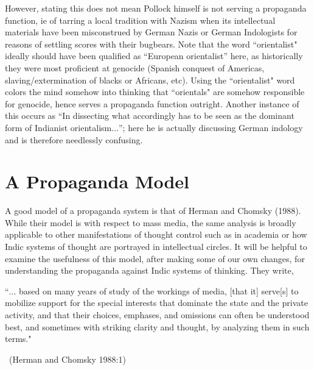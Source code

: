 However, stating this does not mean Pollock himself is not serving a propaganda function, ie of tarring a local tradition with Nazism when its intellectual materials have been misconstrued by German Nazis or German Indologists for reasons of settling scores with their bugbears. Note that the word ``orientalist" ideally should have been qualified as “European orientalist” here, as historically they were most proficient at genocide (Spanish conquest of Americas, slaving/extermination of blacks or Africans, etc). Using the ``orientalist" word colors the mind somehow into thinking that ``orientals" are somehow responsible for genocide, hence serves a propaganda function outright. Another instance of this occurs as “In dissecting what accordingly has to be seen as the dominant form of Indianist orientalism$\ldots$”; here he is actually discussing German indology and is therefore needlessly confusing.

\section*{A Propaganda Model}
A good model of a propaganda system is that of Herman and Chomsky (1988). While their model is with respect to mass media, the same analysis is broadly applicable to other manifestations of thought control such as in academia or how Indic systems of thought are portrayed in intellectual circles. It will be helpful to examine the usefulness of this model, after making some of our own changes, for understanding the propaganda against Indic systems of thinking. They write, 
\smallskip

\begin{myquote}
``$\ldots$ based on many years of study of the workings of media, [that it] serve[s] to mobilize support for the special interests that dominate the state and the private activity, and that their choices, emphases, and omissions can often be understood best, and sometimes with striking clarity and thought, by analyzing them in such terms."

~\hfill(Herman and Chomsky 1988:1)
\end{myquote}
\smallskip

